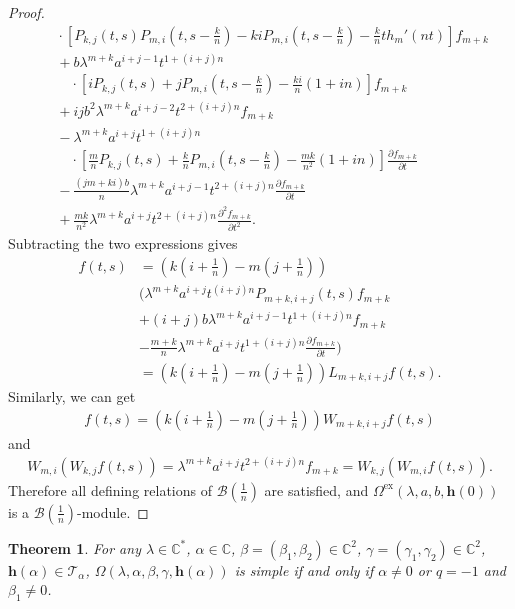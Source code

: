 \documentclass[a4paper]{amsart}
\numberwithin{equation}{section}
\newtheorem{theorem}{Theorem}[section]
\begin{document}
\begin{proof}
{\begin{align*}
		&\quad\cdot\left[P_{k,j}(t,s)P_{m,i}\left(t,s-\frac kn\right)
		-kiP_{m,i}\left(t,s-\frac kn\right)-\frac kn t h_m'(nt)\right]f_{m+k}\\
		&\quad+b\lambda^{m+k}a^{i+j-1}t^{1+(i+j)n}\\
		&\qquad\cdot\left[iP_{k,j}(t,s)+jP_{m,i}\left(t,s-\frac kn\right)-\frac{ki}{n}(1+in)\right]f_{m+k}\\
		&\quad+ijb^2\lambda^{m+k}a^{i+j-2}t^{2+(i+j)n}f_{m+k}\\
		&\quad-\lambda^{m+k}a^{i+j}t^{1+(i+j)n}\\
		&\qquad\cdot\left[\frac mnP_{k,j}(t,s)+\frac knP_{m,i}\left(t,s-\frac kn\right)
		-\frac{mk}{n^2}(1+in)\right]\frac{\partial f_{m+k}}{\partial t}\\
		&\quad-\frac{(jm+ki)b}{n}\lambda^{m+k}a^{i+j-1}t^{2+(i+j)n}
		\frac{\partial f_{m+k}}{\partial t}\\
		&\quad+\frac{mk}{n^2}\lambda^{m+k}a^{i+j}t^{2+(i+j)n}
		\frac{\partial^2f_{m+k}}{\partial t^2}.
		\end{align*}
		}
		Subtracting the two expressions gives
		\begin{align*}
		[L_{m,i},L_{k,j}]f(t,s)
		&=\left(k\left(i+\frac1n\right)-m\left(j+\frac1n\right)\right)\\
		&\Bigg(\lambda^{m+k}a^{i+j}t^{(i+j)n}P_{m+k,i+j}(t,s)f_{m+k}\\
		& +(i+j)b\lambda^{m+k}a^{i+j-1}t^{1+(i+j)n}f_{m+k}\\
		&-\frac{m+k}{n}\lambda^{m+k}a^{i+j}t^{1+(i+j)n}
		\frac{\partial f_{m+k}}{\partial t}\Bigg)\\
		&=\left(k\left(i+\frac1n\right)-m\left(j+\frac1n\right)\right)
		L_{m+k,i+j}f(t,s).
		\end{align*}
			Similarly, we can get
			\begin{align*}
			[L_{m,i},W_{k,j}]f(t,s)
			=\left(k\left(i+\frac1n\right)-m\left(j+\frac1n\right)\right)
			W_{m+k,i+j}f(t,s)
			\end{align*}
		and
		\begin{align*}
		W_{m,i}(W_{k,j}f(t,s))
		=\lambda^{m+k}a^{i+j}t^{2+(i+j)n}f_{m+k}
		=W_{k,j}(W_{m,i}f(t,s)).
		\end{align*}
		Therefore all defining relations of $\mathcal{B}(\frac{1}{n})$ are satisfied, and
		$\Omega^{\mathrm{ex}}(\lambda,a,b,\mathbf h(0))$ is a $\mathcal{B}(\frac{1}{n})$-module.
\end{proof}
 \begin{theorem}\label{thm3.5}
    For any $\lambda\in\mathbb{C}^*$, $\alpha\in\mathbb{C}$, $\beta=(\beta_1,\beta_2)\in\mathbb{C}^{2}$,  $\gamma=(\gamma_1,\gamma_2)\in \mathbb{C}^{2}$, $\mathbf{h}(\alpha)\in \mathcal T_\alpha$, $\Omega(\lambda,\alpha,\beta,\gamma,\mathbf h(\alpha))$ is simple if and only if $\alpha\neq 0$ or $q=-1$ and $\beta_{1}\neq 0$.
 \end{theorem}  
\end{document}
